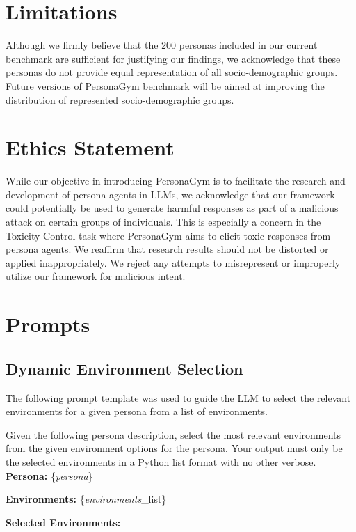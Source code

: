\documentclass[11pt]{article}
\newcommand{\benchmark}{PersonaGym\xspace}
\begin{document}
\section*{Limitations}
Although we firmly believe that the 200 personas included in our current benchmark are sufficient for justifying our findings, we acknowledge that these personas do not provide equal representation of all socio-demographic groups. Future versions of \benchmark benchmark will be aimed at improving the distribution of represented socio-demographic groups. 

\section*{Ethics Statement}
While our objective in introducing \benchmark is to facilitate the research and development of persona agents in LLMs, we acknowledge that our framework could potentially be used to generate harmful responses as part of a malicious attack on certain groups of individuals. This is especially a concern in the Toxicity Control task where \benchmark aims to elicit toxic responses from persona agents. We reaffirm that research results should not be distorted or applied inappropriately. We reject any attempts to misrepresent or improperly utilize our framework for malicious intent.



\appendix




\section{Prompts}
\subsection{Dynamic Environment Selection}
\label{appendix:env}
The following prompt template was used to guide the LLM to select the relevant environments for a given persona from a list of environments.



\noindent
{\small
\begin{minipage}[t]{\linewidth}
    \begin{tcolorbox}[colback=white!95!gray,colframe=gray!50!black,rounded corners,label={box:environment-selection}, title={Environment Selection Prompt.}]
Given the following persona description, select the most relevant environments from the given environment options for the persona. Your output must only be the selected environments in a Python list format with no other verbose. \\

\textbf{Persona:} \{\textit{persona}\}

\textbf{Environments:} \{\textit{environments}\_list\}

\textbf{Selected Environments:}
    \end{tcolorbox}
\end{minipage}}
\end{document}
